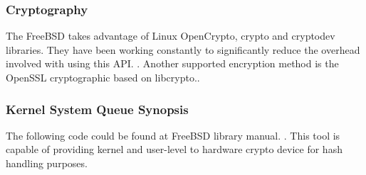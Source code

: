 \documentclass[journal,10pt,onecolumn,compsoc,letterpaper,draftclsnofoot,table,xcdraw]{IEEEtran} \usepackage[margin=0.75in]{geometry}
\begin{document}
\subsubsection{Cryptography}
\noindent The FreeBSD takes advantage of Linux OpenCrypto, crypto and cryptodev libraries. They have been working constantly to significantly reduce the overhead involved with using this API. \cite{12}. Another supported encryption method is the OpenSSL cryptographic based on libcrypto.\cite{13}.
\subsubsection{Kernel System Queue Synopsis}
\noindent The following code could be found at FreeBSD library manual. \cite{11}. This tool is capable of providing kernel and user-level to hardware crypto device for  hash handling purposes. 
\end{document}
